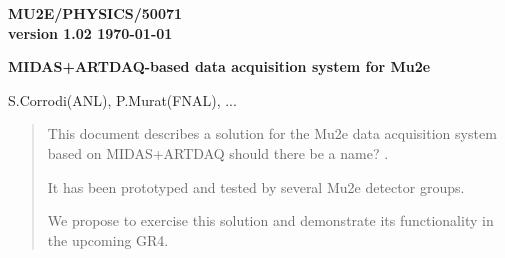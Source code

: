 \documentclass[12pt]{article}
\begin{document}
\begin{titlepage}
  \begin{flushright}
    \bf {MU2E/PHYSICS/50071} \\
    version 1.02
    \today
 \end{flushright}

  \vspace{1cm}

  \begin{center}
    {\Large \bf MIDAS+ARTDAQ-based data acquisition system for Mu2e
      \vspace{0.3in}
    }

    \vspace{1cm}
    S.Corrodi(ANL), P.Murat(FNAL), ...

    \vspace{0.3cm}

    \vspace{0.8cm}
  \end{center}

  \begin{abstract}
    \vspace{0.2in}

    This document describes a solution for the Mu2e data acquisition
    system based on MIDAS+ARTDAQ {\red should there be a name? }.

    It has been prototyped and tested by several Mu2e
    detector groups. 

    We propose to exercise this solution and demonstrate
    its functionality in the upcoming GR4.
  \end{abstract}

\end{titlepage}
%
%
%
{\tableofcontents}

% 

\newpage
\end{document}
